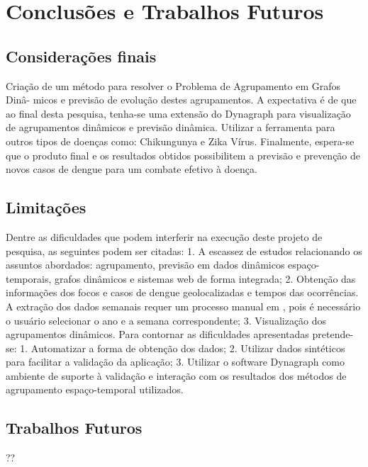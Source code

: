 \chapter{Conclusões e Trabalhos Futuros}
\label{chap:conclusoes-e-trabalhos-futuros}

\section{Considerações finais}
\label{sec:contribuicoes-do-trabalho}

Criação de um método para resolver o Problema de Agrupamento em Grafos Dinâ-
micos e previsão de evolução destes agrupamentos.
A expectativa é de que ao final desta pesquisa, tenha-se uma extensão do Dynagraph
para visualização de agrupamentos dinâmicos e previsão dinâmica.
Utilizar a ferramenta para outros tipos de doenças como: Chikungunya e Zika Vírus.
Finalmente, espera-se que o produto final e os resultados obtidos possibilitem a previsão e
prevenção de novos casos de dengue para um combate efetivo à doença.

\section{Limitações}
\label{sec:limitacoes}

Dentre as dificuldades que podem interferir na execução deste projeto de pesquisa,
as seguintes podem ser citadas:
1. A escassez de estudos relacionando os assuntos abordados: agrupamento, previsão em
dados dinâmicos espaço-temporais, grafos dinâmicos e sistemas web de forma integrada;
2. Obtenção das informações dos focos e casos de dengue geolocalizadas e tempos das
ocorrências. A extração dos dados semanais requer um processo manual em \cite{simda},
pois é necessário o usuário selecionar o ano e a semana correspondente;
3. Visualização dos agrupamentos dinâmicos.
Para contornar as dificuldades apresentadas pretende-se:
1. Automatizar a forma de obtenção dos dados;
2. Utilizar dados sintéticos para facilitar a validação da aplicação;
3. Utilizar o software Dynagraph como ambiente de suporte à validação e interação com os
resultados dos métodos de agrupamento espaço-temporal utilizados.

\section{Trabalhos Futuros}
\label{sec:trabalhos-futuros}

??





